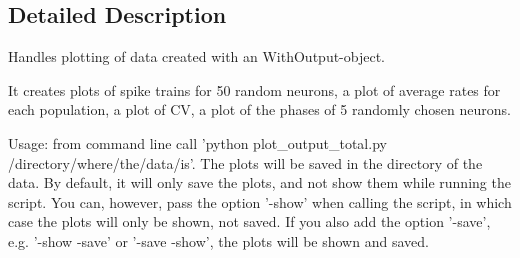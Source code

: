 \subsection{Detailed Description}
\begin{DoxyVerb}Handles plotting of data created with an WithOutput-object.

It creates plots of spike trains for 50 random neurons,
a plot of average rates for each population,
a plot of CV,
a plot of the phases of 5 randomly chosen neurons.

Usage: from command line call 'python plot_output_total.py /directory/where/the/data/is'.
The plots will be saved in the directory of the data.
By default, it will only save the plots, and not show them while running the script.
You can, however, pass the option '-show' when calling the script,
in which case the plots will only be shown, not saved.
If you also add the option '-save', e.g. '-show -save' or '-save -show',
the plots will be shown and saved. 
\end{DoxyVerb}
 